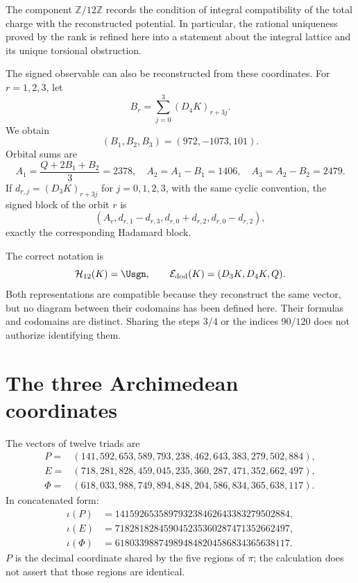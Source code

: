 The component \(\mathbb Z/12\mathbb Z\) records the condition of
integral compatibility of the total charge with the reconstructed potential.
In particular, the rational uniqueness proved by the rank is refined here into
a statement about the integral lattice and its unique torsional obstruction.

The signed observable can also be reconstructed from these coordinates.
For \(r=1,2,3\), let
\[
B_r=\sum_{j=0}^{3}(D_4K)_{r+3j}.
\]
We obtain
\[
(B_1,B_2,B_3)=(972,-1073,101).
\]
Orbital sums are
\[
A_1=\frac{Q+2B_1+B_2}{3}=2378,
\quad
A_2=A_1-B_1=1406,
\quad
A_3=A_2-B_2=2479.
\]
If
\(d_{r,j}=(D_3K)_{r+3j}\) for \(j=0,1,2,3\), with the same cyclic
convention, the signed block of the orbit \(r\) is
\[
(A_r,d_{r,1}-d_{r,3},d_{r,0}+d_{r,2},d_{r,0}-d_{r,2}),
\]
exactly the corresponding Hadamard block.

\begin{remark}
The correct notation is
\[
\mathcal H_{12}(K)=\Usgn,
\qquad
\mathcal E_{\mathrm{dod}}(K)=(D_3K,D_4K,Q).
\]
Both representations are compatible because they reconstruct the same vector,
but no diagram between their codomains has been defined here. Their formulas and
codomains are distinct. Sharing the steps \(3/4\) or the indices \(90/120\) does not
authorize identifying them.
\end{remark}

\section{The three Archimedean coordinates}

The vectors of twelve triads are
\[
\begin{aligned}
P={}&(141,592,653,589,793,238,462,643,383,279,502,884),\\
E={}&(718,281,828,459,045,235,360,287,471,352,662,497),\\
\Phi={}&(618,033,988,749,894,848,204,586,834,365,638,117).
\end{aligned}
\]
In concatenated form:
\[
\begin{aligned}
\iota(P)&=141592653589793238462643383279502884,\\
\iota(E)&=718281828459045235360287471352662497,\\
\iota(\Phi)&=618033988749894848204586834365638117.
\end{aligned}
\]
\(P\) is the decimal coordinate shared by the five regions of
\(\pi\); the calculation does not assert that those regions are identical.


